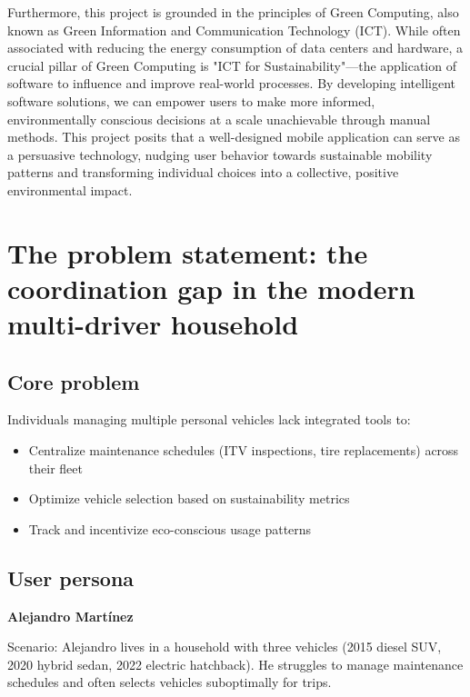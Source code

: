 \textgap

Furthermore, this project is grounded in the principles of Green Computing, also known as Green Information and Communication Technology (ICT). While often associated with reducing the energy consumption of data centers and hardware, a crucial pillar of Green Computing is "ICT for Sustainability"—the application of software to influence and improve real-world processes. By developing intelligent software solutions, we can empower users to make more informed, environmentally conscious decisions at a scale unachievable through manual methods. This project posits that a well-designed mobile application can serve as a persuasive technology, nudging user behavior towards sustainable mobility patterns and transforming individual choices into a collective, positive environmental impact.

\section{The problem statement: the coordination gap in the modern multi-driver household}

\subsection{Core problem}

Individuals managing multiple personal vehicles lack integrated tools to:

\begin{itemize}
    \item Centralize maintenance schedules (ITV inspections, tire replacements) across their fleet

    \item Optimize vehicle selection based on sustainability metrics

    \item Track and incentivize eco-conscious usage patterns
\end{itemize}

\subsection{User persona}
\textbf{Alejandro Martínez}

\vspace{0.7em}

\begin{flushleft}
    Scenario: Alejandro lives in a household with three vehicles (2015 diesel SUV, 2020 hybrid sedan, 2022 electric hatchback). He struggles to manage maintenance schedules and often selects vehicles suboptimally for trips.
\end{flushleft}

